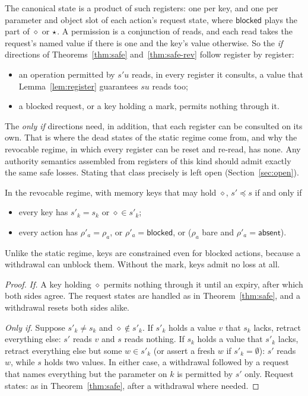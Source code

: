 The canonical state is a product of such registers: one per key, and one per parameter and
object slot of each action's request state, where $\mathsf{blocked}$ plays the part of $\diamond$
or $\star$. A permission is a conjunction of reads, and each read takes the request's named
value if there is one and the key's value otherwise. So the \emph{if} directions of
Theorems~\ref{thm:safe} and~\ref{thm:safe-rev} follow register by register:
\begin{itemize}
\item an operation permitted by $s'u$ reads, in every register it consults, a value that
  Lemma~\ref{lem:register} guarantees $su$ reads too;
\item a blocked request, or a key holding a mark, permits nothing through it.
\end{itemize}
The \emph{only if} directions need, in addition, that each register can be consulted on its own.
That is where the dead states of the static regime come from, and why the revocable regime, in
which every register can be reset and re-read, has none. Any authority semantics assembled from
registers of this kind should admit exactly the same safe losses. Stating that class precisely is
left open (Section~\ref{sec:open}).

\begin{theorem}\label{thm:safe-rev}
In the revocable regime, with memory keys that may hold $\diamond$, $s' \preceq s$ if and only if
\begin{itemize}
\item every key has $s'_k = s_k$ or $\diamond \in s'_k$;
\item every action has $\rho'_a = \rho_a$, or $\rho'_a = \mathsf{blocked}$, or ($\rho_a$ bare and
  $\rho'_a = \mathsf{absent}$).
\end{itemize}
Unlike the static regime, keys are constrained even for blocked actions, because a withdrawal can
unblock them. Without the mark, keys admit no loss at all.
\end{theorem}
\begin{proof}
\emph{If.} A key holding $\diamond$ permits nothing through it until an expiry, after which both
sides agree. The request states are handled as in Theorem~\ref{thm:safe}, and a withdrawal resets
both sides alike.

\emph{Only if.} Suppose $s'_k \neq s_k$ and $\diamond \notin s'_k$. If $s'_k$ holds a value $v$ that
$s_k$ lacks, retract everything else: $s'$ reads $v$ and $s$ reads nothing. If $s_k$ holds a value
that $s'_k$ lacks, retract everything else but some $w \in s'_k$ (or assert a fresh $w$ if
$s'_k = \emptyset$): $s'$ reads $w$, while $s$ holds two values. In either case, a withdrawal
followed by a request that names everything but the parameter on $k$ is permitted by $s'$ only.
Request states: as in Theorem~\ref{thm:safe}, after a withdrawal where needed.
\end{proof}


